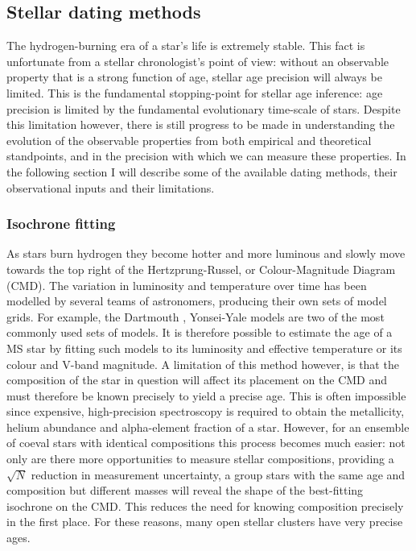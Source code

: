 \subsection*{Stellar dating methods}

The hydrogen-burning era of a star's life is extremely stable.
This fact is unfortunate from a stellar chronologist's point of view: without
an observable property that is a strong function of age, stellar age precision
will always be limited.
This is the fundamental stopping-point for stellar age inference: age
precision is limited by the fundamental evolutionary time-scale of stars.
Despite this limitation however, there is still progress to be made in
understanding the evolution of the observable properties from both empirical
and theoretical standpoints, and in the precision with which we can measure
these properties.
In the following section I will describe some of the available dating methods,
their observational inputs and their limitations.

\subsubsection*{Isochrone fitting}
As stars burn hydrogen they become hotter and more luminous and slowly move
towards the top right of the Hertzprung-Russel, or Colour-Magnitude Diagram
(CMD).
The variation in luminosity and temperature over time has been modelled by
several teams of astronomers, producing their own sets of model grids.
For example, the Dartmouth \citep{dotter}, Yonsei-Yale \citep{spada} models
are two of the most commonly used sets of models.
It is therefore possible to estimate the age of a MS star by fitting such
models to its luminosity and effective temperature or its colour and V-band
magnitude.
A limitation of this method however, is that the composition of the star in
question will affect its placement on the CMD and must therefore be known
precisely to yield a precise age.
This is often impossible since expensive, high-precision spectroscopy is
required to obtain the metallicity, helium abundance and alpha-element
fraction of a star.
However, for an ensemble of coeval stars with identical compositions this
process becomes much easier: not only are there more opportunities to measure
stellar compositions, providing a $\sqrt N$ reduction in measurement
uncertainty, a group stars with the same age and composition but different
masses will reveal the shape of the best-fitting isochrone on the CMD\@.
This reduces the need for knowing composition precisely in the first place.
For these reasons, many open stellar clusters have very precise ages.

